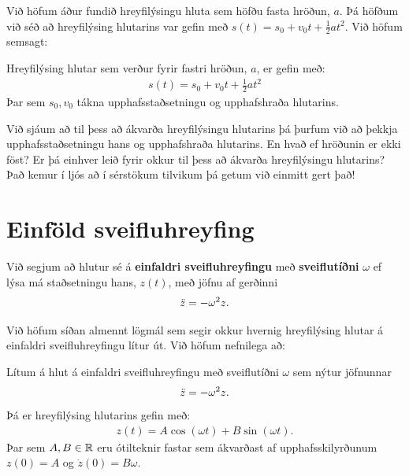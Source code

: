 \ifdefined \wholebook \else\documentclass[oneside]{book}\usepackage{EdlBook}\graphicspath{{figures/}}
\begin{document}
Við höfum áður fundið hreyfilýsingu hluta sem höfðu fasta hröðun, $a$. Þá höfðum við séð að hreyfilýsing hlutarins var gefin með $s(t) = s_0 + v_0 t + \frac{1}{2}at^2$. Við höfum semsagt:

\begin{tcolorbox}
\begin{theorem}
Hreyfilýsing hlutar sem verður fyrir fastri hröðun, $a$, er gefin með:
\begin{align*}
    s(t) = s_0 + v_0 t + \frac{1}{2} at^2
\end{align*}
Þar sem $s_0, v_0$ tákna upphafsstaðsetningu og upphafshraða hlutarins.
\end{theorem}
\end{tcolorbox}

Við sjáum að til þess að ákvarða hreyfilýsingu hlutarins þá þurfum við að þekkja upphafsstaðsetningu hans og upphafshraða hlutarins. En hvað ef hröðunin er ekki föst? Er þá einhver leið fyrir okkur til þess að ákvarða hreyfilýsingu hlutarins? Það kemur í ljós að í sérstökum tilvikum þá getum við einmitt gert það!

\newpage

\section{Einföld sveifluhreyfing}

\begin{tcolorbox}
\begin{definition}
Við segjum að hlutur sé á \textbf{einfaldri sveifluhreyfingu} með \textbf{sveiflutíðni} $\omega$ ef lýsa má staðsetningu hans, $z(t)$, með jöfnu af gerðinni
\begin{align*}
    \Ddot{z} = -\omega^2 z.
\end{align*}
\end{definition}
\end{tcolorbox}

Við höfum síðan almennt lögmál sem segir okkur hvernig hreyfilýsing hlutar á einfaldri sveifluhreyfingu lítur út. Við höfum nefnilega að:

\begin{tcolorbox}
\begin{setning} \label{regla:einfold-sveifla}
Lítum á hlut á einfaldri sveifluhreyfingu með sveiflutíðni $\omega$ sem nýtur jöfnunnar
\begin{align*}
    \Ddot{z} = -\omega^2 z.
\end{align*}
Þá er hreyfilýsing hlutarins gefin með:
\begin{align*}
z(t) = A\cos(\omega t) + B\sin(\omega t).
\end{align*}
Þar sem $A,B \in \mathbb{R}$ eru ótilteknir fastar sem ákvarðast af upphafsskilyrðunum $z(0) = A$ og $\dot{z}(0) = B\omega$.
\end{setning}
\end{tcolorbox}
\end{document}
